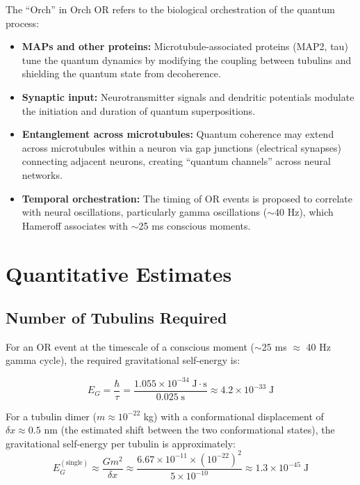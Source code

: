 \documentclass[11pt,a4paper]{report}
\begin{document}
The ``Orch'' in Orch OR refers to the biological orchestration of the quantum process:

\begin{mechbox}
\begin{itemize}[leftmargin=1.5em]
  \item \textbf{MAPs and other proteins:} Microtubule-associated proteins (MAP2, tau) tune the quantum dynamics by modifying the coupling between tubulins and shielding the quantum state from decoherence.
  \item \textbf{Synaptic input:} Neurotransmitter signals and dendritic potentials modulate the initiation and duration of quantum superpositions.
  \item \textbf{Entanglement across microtubules:} Quantum coherence may extend across microtubules within a neuron via gap junctions (electrical synapses) connecting adjacent neurons, creating ``quantum channels'' across neural networks.
  \item \textbf{Temporal orchestration:} The timing of OR events is proposed to correlate with neural oscillations, particularly gamma oscillations ($\sim$40 Hz), which Hameroff associates with $\sim$25 ms conscious moments.
\end{itemize}
\end{mechbox}

\section{Quantitative Estimates}

\subsection{Number of Tubulins Required}

For an OR event at the timescale of a conscious moment ($\sim$25 ms $\approx$ 40 Hz gamma cycle), the required gravitational self-energy is:

\begin{mathbox}
\vspace{-6pt}
\[
  E_G = \frac{\hbar}{\tau} = \frac{1.055 \times 10^{-34}\; \text{J}\cdot\text{s}}{0.025\; \text{s}} \approx 4.2 \times 10^{-33}\; \text{J}
\]
\vspace{-8pt}
\end{mathbox}

For a tubulin dimer ($m \approx 10^{-22}$ kg) with a conformational displacement of $\delta x \approx 0.5$ nm (the estimated shift between the two conformational states), the gravitational self-energy per tubulin is approximately:
\[
  E_G^{(\text{single})} \approx \frac{G m^2}{\delta x} \approx \frac{6.67 \times 10^{-11} \times (10^{-22})^2}{5 \times 10^{-10}} \approx 1.3 \times 10^{-45}\; \text{J}
\]
\end{document}

